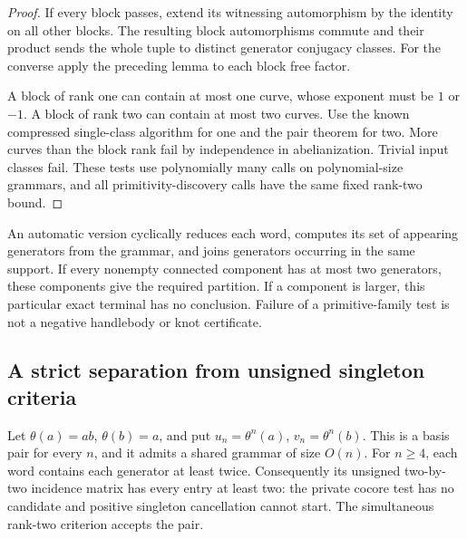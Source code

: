 \begin{proof}
If every block passes, extend its witnessing automorphism by the identity
on all other blocks.  The resulting block automorphisms commute and their
product sends the whole tuple to distinct generator conjugacy classes.
For the converse apply the preceding lemma to each block free factor.

A block of rank one can contain at most one curve, whose exponent must be
$1$ or $-1$.  A block of rank two can contain at most two curves.  Use the
known compressed single-class algorithm for one and the pair theorem for
two.  More curves than the block rank fail by independence in abelianization.
Trivial input classes fail.  These tests use polynomially many calls on
polynomial-size grammars, and all primitivity-discovery calls have the same
fixed rank-two bound.
\end{proof}

An automatic version cyclically reduces each word, computes its set of
appearing generators from the grammar, and joins generators occurring in
the same support.  If every nonempty connected component has at most two
generators, these components give the required partition.  If a component
is larger, this particular exact terminal has no conclusion.  Failure of a
primitive-family test is not a negative handlebody or knot certificate.

\subsection{A strict separation from unsigned singleton criteria}

Let $\theta(a)=ab$, $\theta(b)=a$, and put
$u_n=\theta^n(a)$, $v_n=\theta^n(b)$.  This is a basis pair for every
$n$, and it admits a shared grammar of size $O(n)$.  For $n\ge4$, each
word contains each generator at least twice.  Consequently its unsigned
two-by-two incidence matrix has every entry at least two: the private
cocore test has no candidate and positive singleton cancellation cannot
start.  The simultaneous rank-two criterion accepts the pair.

